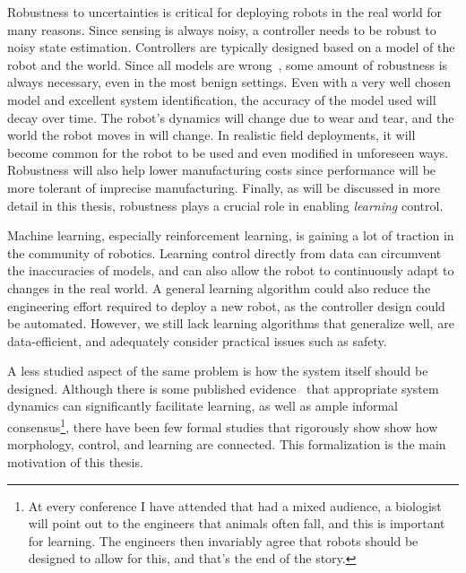 Robustness to uncertainties is critical for deploying robots in the real world for many reasons.
Since sensing is always noisy, a controller needs to be robust to noisy state estimation.
Controllers are typically designed based on a model of the robot and the world. Since all models are wrong~\cite{box1976science}, some amount of robustness is always necessary, even in the most benign settings.
Even with a very well chosen model and excellent system identification, the accuracy of the model used will decay over time.
The robot's dynamics will change due to wear and tear, and the world the robot moves in will change.
In realistic field deployments, it will become common for the robot to be used and even modified in unforeseen ways.
Robustness will also help lower manufacturing costs since performance will be more tolerant of imprecise manufacturing.
Finally, as will be discussed in more detail in this thesis, robustness plays a crucial role in enabling \emph{learning} control.
\par
Machine learning, especially reinforcement learning, is gaining a lot of traction in the community of robotics. Learning control directly from data can circumvent the inaccuracies of models, and can also allow the robot to continuously adapt to changes in the real world.
A general learning algorithm could also reduce the engineering effort required to deploy a new robot, as the controller design could be automated.
However, we still lack learning algorithms that generalize well, are data-efficient, and adequately consider practical issues such as safety. \par
A less studied aspect of the same problem is how the system itself should be designed. Although there is some published evidence~\cite{tedrake2005learning, randlov2000shaping} that appropriate system dynamics can significantly facilitate learning, as well as ample informal consensus\footnote{At every conference I have attended that had a mixed audience, a biologist will point out to the engineers that animals often fall, and this is important for learning. The engineers then invariably agree that robots should be designed to allow for this, and that's the end of the story.}, there have been few formal studies that rigorously show show how morphology, control, and learning are connected. This formalization is the main motivation of this thesis.

